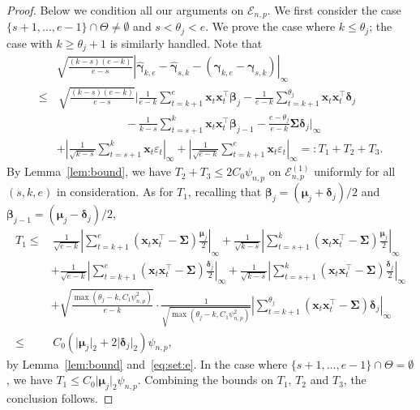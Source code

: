 \documentclass[11pt, a4paper]{article}
\newcommand{\mbf}{\mathbf}
\newcommand{\mc}{\mathcal}
\newcommand{\vep}{\varepsilon}
\renewcommand{\l}{\left}
\renewcommand{\r}{\right}
\def\wh{\widehat}
\newcommand{\cp}{\theta}
\newcommand{\Cp}{\Theta}
\theoremstyle{definition}
\theoremstyle{definition}
\theoremstyle{definition}
\theoremstyle{definition}
\theoremstyle{definition}
\theoremstyle{remark}
\theoremstyle{definition}
\theoremstyle{definition}
\theoremstyle{definition}
\begin{document}
\begin{proof} 
	Below we condition all our arguments on $\mc E_{n, p}$.
	We first consider the case $\{s + 1, \ldots, e - 1\} \cap \Cp \ne \emptyset$ and $s <  \cp_j < e$.
	We prove the case where $k \le \cp_j$; the case with $k \ge \cp_j + 1$ is similarly handled. Note that
	\begin{align*}
	& \sqrt{\frac{(k - s)(e - k)}{e - s}} \l\vert \wh{\bm\gamma}_{k, e} - \wh{\bm\gamma}_{s, k} - \l( \bm\gamma_{k, e} - \bm\gamma_{s, k} \r) \r\vert_\infty 
 \\
	\le & \,
	\sqrt{\frac{(k - s)(e - k)}{e - s}} \Biggl\vert \frac{1}{e - k} \sum_{t = k + 1}^e \mbf x_t \mbf x_t^\top \bm\beta_j  - \frac{1}{e - k} \sum_{t = k + 1}^{\cp_j} \mbf x_t \mbf x_t^\top \bm\delta_j
	\\
	& \qquad \qquad \qquad 
	- \frac{1}{k - s} \sum_{t = s + 1}^k \mbf x_t \mbf x_t^\top \bm\beta_{j - 1}
	- \frac{e - \cp_j}{e - k} \bm\Sigma \bm\delta_j \Biggr\vert_\infty
	\\
	& + \l\vert \frac{1}{\sqrt{k - s}} \sum_{t = s + 1}^k \mbf x_t \vep_t \r\vert_\infty
	+ \l\vert \frac{1}{\sqrt{e - k}} \sum_{t = k + 1}^e \mbf x_t \vep_t \r\vert_\infty
	=: T_1 + T_2 + T_3.
	\end{align*}
	By Lemma~\ref{lem:bound}, we have $T_2 + T_3 \le 2 C_0\psi_{n, p}$ on $\mc E_{n, p}^{(1)}$ uniformly for all $(s, k, e)$ in consideration.
	As for $T_1$, recalling that $\bm\beta_j = (\bm\mu_j + \bm\delta_j)/2$ and $\bm\beta_{j - 1} = (\bm\mu_j - \bm\delta_j)/2$, 
	\begin{align*}
	T_1 \le & \, \frac{1}{\sqrt{e - k}} \l\vert \sum_{t = k + 1}^e \l( \mbf x_t \mbf x_t^\top - \bm\Sigma \r) \frac{\bm\mu_j}{2} \r\vert_\infty
	+ \frac{1}{\sqrt{k - s}} \l\vert \sum_{t = s + 1}^k \l( \mbf x_t \mbf x_t^\top - \bm\Sigma \r) \frac{\bm\mu_j}{2} \r\vert_\infty
	\\
	& + \frac{1}{\sqrt{e - k}} \l\vert  \sum_{t = k + 1}^e \l( \mbf x_t \mbf x_t^\top - \bm\Sigma \r) \frac{\bm\delta_j}{2} \r\vert_\infty
	+ \frac{1}{\sqrt{k - s}} \l\vert \sum_{t = s + 1}^k \l( \mbf x_t \mbf x_t^\top - \bm\Sigma \r) \frac{\bm\delta_j}{2} \r\vert_\infty
	\\
	& + \sqrt{\frac{\max(\cp_j - k, C_1\psi_{n, p}^2)}{e - k}} \cdot \frac{1}{\sqrt{\max(\cp_j - k, C_1\psi_{n, p}^2)}} \l\vert  \sum_{t = k + 1}^{\cp_j} \l(\mbf x_t \mbf x_t^\top - \bm\Sigma \r) \bm\delta_j \r\vert_\infty
	\\
	\le & \, C_0 (\vert \bm\mu_j \vert_2 + 2\vert \bm\delta_j \vert_2 ) \psi_{n, p},
	\end{align*}
	by Lemma~\ref{lem:bound} and~\eqref{eq:set:e}.
	In the case where $\{s + 1, \ldots, e - 1\} \cap \Cp = \emptyset$, we have $T_1 \le C_0 \vert \bm\mu_j \vert_2 \psi_{n, p}$.
	Combining the bounds on $T_1$, $T_2$ and $T_3$, the conclusion follows.
\end{proof}
\end{document}
